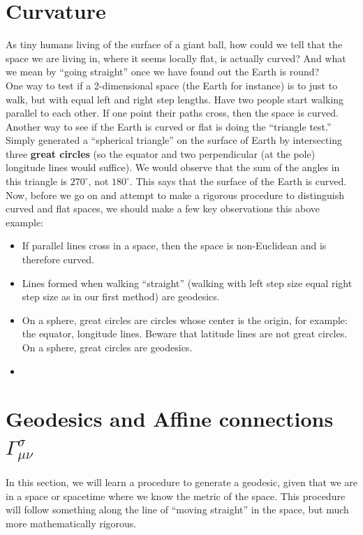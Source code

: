 \documentclass{book}
\theoremstyle{definition}
\begin{document}
\section{Curvature}
As tiny humans living of the surface of a giant ball, how could we tell that the space we are living in, where it seems locally flat, is actually curved? And what we mean by ``going straight'' once we have found out the Earth is round?\\

One way to test if a 2-dimensional space (the Earth for instance) is to just to walk, but with equal left and right step lengths. Have two people start walking parallel to each other. If one point their paths cross, then the space is curved.\\

Another way to see if the Earth is curved or flat is doing the ``triangle test.'' Simply generated a ``spherical triangle'' on the surface of Earth by intersecting three \textbf{great circles} (so the equator and two perpendicular (at the pole) longitude lines would suffice). We would observe that the sum of the angles in this triangle is $270^\circ$, not $180^\circ$. This says that the surface of the Earth is curved.\\

Now, before we go on and attempt to make a rigorous procedure to distinguish curved and flat spaces, we should make a few key observations this above example: 
\begin{itemize}
	\item If parallel lines cross in a space, then the space is non-Euclidean and is therefore curved. 
	\item Lines formed when walking ``straight'' (walking with left step size equal right step size as in our first method) are geodesics. 
	\item On a sphere, great circles are circles whose center is the origin, for example: the equator, longitude lines. Beware that latitude lines are not great circles. On a sphere, great circles are geodesics. 
	\item 
\end{itemize}

\section{Geodesics and Affine connections $\Gamma^{\sigma}_{\mu\nu}$}
In this section, we will learn a procedure to generate a geodesic, given that we are in a space or spacetime where we know the metric of the space. This procedure will follow something along the line of ``moving straight'' in the space, but much more mathematically rigorous.\\
\end{document}
